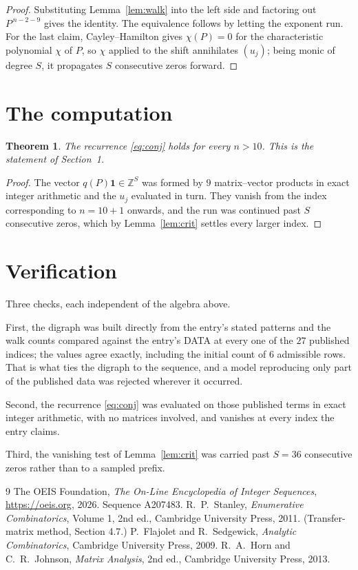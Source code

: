 \documentclass[11pt,a4paper]{article}
\theoremstyle{plain}
\newtheorem{theorem}{Theorem}
\theoremstyle{definition}
\begin{document}
\begin{proof}
Substituting Lemma~\ref{lem:walk} into the left side and factoring out
$P^{\,n-2-9}$ gives the identity. The equivalence follows by letting the exponent
run. For the last claim, Cayley--Hamilton gives $\chi(P)=0$ for the characteristic
polynomial $\chi$ of $P$, so $\chi$ applied to the shift annihilates $(u_j)$; being monic of
degree $S$, it propagates $S$ consecutive zeros forward.
\end{proof}

\section{The computation}

\begin{theorem}
The recurrence \eqref{eq:conj} holds for every $n>10$. This is the statement of
Section~1.
\end{theorem}

\begin{proof}
The vector $q(P)\mathbf{1}\in\mathbb{Z}^{S}$ was formed by $9$ matrix--vector
products in exact integer arithmetic and the $u_j$ evaluated in turn. They vanish from the
index corresponding to $n=10+1$ onwards, and the run was continued past $S$ consecutive
zeros, which by Lemma~\ref{lem:crit} settles every larger index.
\end{proof}

\section{Verification}

Three checks, each independent of the algebra above.

First, the digraph was built directly from the entry's stated patterns and the walk counts
compared against the entry's DATA at every one of the $27$ published indices; the
values agree exactly, including the initial count of $6$ admissible rows. That is
what ties the digraph to the sequence, and a model reproducing only part of the published
data was rejected wherever it occurred.

Second, the recurrence \eqref{eq:conj} was evaluated on those published terms in exact
integer arithmetic, with no matrices involved, and vanishes at every index the entry claims.

Third, the vanishing test of Lemma~\ref{lem:crit} was carried past $S=36$ consecutive
zeros rather than to a sampled prefix.

\begin{thebibliography}{9}
 The OEIS Foundation, \emph{The On-Line Encyclopedia of Integer
Sequences}, \url{https://oeis.org}, 2026. Sequence A207483.
 R.~P.~Stanley, \emph{Enumerative Combinatorics}, Volume 1, 2nd ed.,
Cambridge University Press, 2011. (Transfer-matrix method, Section 4.7.)
 P.~Flajolet and R.~Sedgewick, \emph{Analytic Combinatorics}, Cambridge
University Press, 2009.
 R.~A.~Horn and C.~R.~Johnson, \emph{Matrix Analysis}, 2nd ed., Cambridge
University Press, 2013.
\end{thebibliography}
\end{document}
